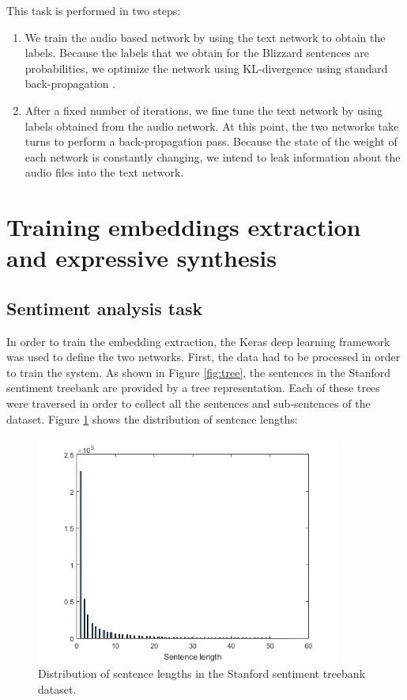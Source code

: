 This task is performed in two steps:

\begin{enumerate}
    \item We train the audio based network by using the text network to obtain the labels. Because the labels that we obtain for the Blizzard sentences are probabilities, we optimize the network using KL-divergence using standard back-propagation \cite{aytar2016soundnet}.
    \item After a fixed number of iterations, we fine tune \cite{yosinski2014transferable} the text network by using labels obtained from the audio network. At this point, the two networks take turns to perform a back-propagation pass. Because the state of the weight of each network is constantly changing, we intend to leak information about the audio files into the text network.
\end{enumerate}

\section{Training embeddings extraction and expressive synthesis} \label{sec:domain}

\subsection*{Sentiment analysis task}

In order to train the embedding extraction, the Keras deep learning framework was used to define the two networks. First, the data had to be processed in order to train the system. As shown in Figure \ref{fig:tree}, the sentences in the Stanford sentiment treebank are provided by a tree representation. Each of these trees were traversed in order to collect all the sentences and sub-sentences of the dataset. Figure \ref{fig:sent-histo} shows the distribution of sentence lengths:

\begin{figure}[h]
    \centering
    \includegraphics[width=10cm]{figures/sa-histo}
    \caption{Distribution of sentence lengths in the Stanford sentiment treebank dataset.}
    \label{fig:sent-histo}
\end{figure}

